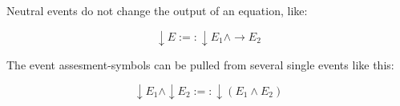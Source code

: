 \documentclass{scrartcl}
\begin{document}
Neutral events do not change the output of an equation, like:

\begin{equation}\downarrow E :=: \downarrow E_1 \wedge \rightarrow E_2\end{equation}

The event assesment-symbols can be pulled from several single events like this:

\begin{equation}\downarrow E_1 \wedge \downarrow E_2 :=: \downarrow \left(E_1 \wedge E_2\right)\end{equation}

\begin{comment}
\section{Example}

Let's construct the XOR-Operator $\oplus$. It is true for $a, b$ iff $(a \wedge \lnot b) \lor (\lnot a \wedge b)$ .

Let $a, b$ be any type of Events consisting of a time string $t$, a positive-negative-neutral-modifier $m$ and the Events $a = E_1, b = E_2$.

We have an equation of the form:

\begin{equation}
	\left(
		\left(
			t_1 m_1 E_1 
		\right)
		\lor
		\lnot \left(
			t_2 m_2 E_2
		\right)
	\right)
	\lor 
	\left(
		\lnot\left(
			t_1 m_1 E_1
		\right) 
		\lor 
		\left(
			t_2 m_2 E_2
		\right)
	\right)
\end{equation}

\end{comment}
\end{document}
